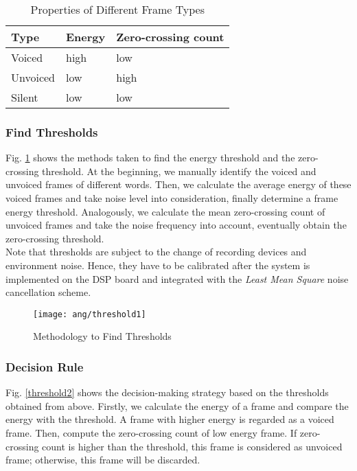 \begin{table}[H]
\centering
\begin{tabu} to 0.8\textwidth {XXX}
\toprule
Type &Energy &Zero-crossing count\\
\hline
Voiced &high &low\\
\hline
Unvoiced &low &high\\
\hline
Silent &low &low\\
\bottomrule
\end{tabu}
\caption{Properties of Different Frame Types}
\label{table:thresholds}
\end{table}


\subsubsection{Find Thresholds}

Fig. \ref{threshold1} shows the methods taken to find the energy threshold and the zero-crossing threshold. At the beginning, we manually identify the voiced and unvoiced frames of different words. Then, we calculate the average energy of these voiced frames and take noise level into consideration, finally determine a frame energy threshold. Analogously, we calculate the mean zero-crossing count of unvoiced frames and take the noise frequency into account, eventually obtain the zero-crossing threshold.\\

Note that thresholds are subject to the change of recording devices and environment noise. Hence, they have to be calibrated after the system is implemented on the DSP board and integrated with the \textit{Least Mean Square} noise cancellation scheme.

\begin{figure}[H]
\centering
\texttt{[image: ang/threshold1]}
\caption{Methodology to Find Thresholds}
\label{threshold1}
\end{figure}


\subsubsection{Decision Rule}

Fig. \ref{threshold2} shows the decision-making strategy based on the thresholds obtained from above. Firstly, we calculate the energy of a frame and compare the energy with the threshold. A frame with higher energy is regarded as a voiced frame. Then, compute the zero-crossing count of low energy frame. If zero-crossing count is higher than the threshold, this frame is considered as unvoiced frame; otherwise, this frame will be discarded.

